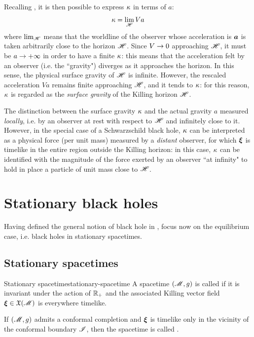 Recalling , it is then possible to express $ \kappa $ in terms of $ a $:
\begin{equation}
  \kappa = \lim_\mathscr{H} V a
\end{equation}
where $ \lim_\mathscr{H} $ means that the worldline of the observer whose acceleration is $ \boldsymbol{a} $ is taken arbitrarily close to the horizon $ \mathscr{H} $. Since $ V \rightarrow 0 $ approaching $ \mathscr{H} $, it must be $ a \rightarrow + \infty $ in order to have a finite $ \kappa $: this means that the acceleration felt by an observer (i.e. the ``gravity") diverges as it approaches the horizon. In this sense, the physical surface gravity of $ \mathscr{H} $ is infinite. However, the rescaled acceleration $ V a $ remains finite approaching $ \mathscr{H} $, and it tends to $ \kappa $: for this reason, $ \kappa $ is regarded as the \emph{surface gravity} of the Killing horizon $ \mathscr{H} $.

The distinction between the surface gravity $ \kappa $ and the actual gravity $ a $ measured \emph{locally}, i.e. by an observer at rest with respect to $ \mathscr{H} $ and infinitely close to it. However, in the special case of a Schwarzschild black hole, $ \kappa $ can be interpreted as a physical force (per unit mass) measured by a \emph{distant} observer, for which $ \boldsymbol{\xi} $ is timelike in the entire region outside the Killing horizon\footnotemark: in this case, $ \kappa $ can be identified with the magnitude of the force exerted by an observer ``at infinity" to hold in place a particle of unit mass close to $ \mathscr{H} $.


\section{Stationary black holes}
\label{sec:bh-stationary}

Having defined the general notion of black hole in , focus now on the equilibrium case, i.e. black holes in stationary spacetimes.

\subsection{Stationary spacetimes}

\begin{definition}{Stationary spacetime}{stationary-spacetime}
  A spacetime $ (\mathscr{M} , g) $ is called  if it is invariant under the action of $ \mathbb{R}_+ $ and the associated Killing vector field $ \boldsymbol{\xi} \in \mathfrak{X}(\mathscr{M}) $ is everywhere timelike.

  If $ (\mathscr{M} , g) $ admits a conformal completion and $ \boldsymbol{\xi} $ is timelike only in the vicinity of the conformal boundary $ \mathscr{I} $, then the spacetime is called .
\end{definition}

